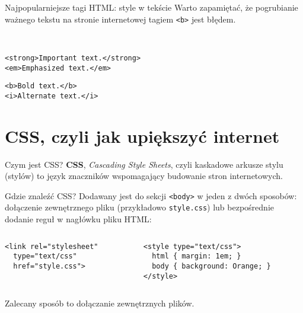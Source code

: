 \begin{frame}[fragile]{Najpopularniejsze tagi HTML: style w tekście}
	Warto zapamiętać, że pogrubianie ważnego tekstu na stronie internetowej tagiem \texttt{<b>} jest błędem. 
	
	\ \\

	\begin{lstlisting}
<strong>Important text.</strong>
<em>Emphasized text.</em>
	\end{lstlisting}
	
	\begin{lstlisting}
<b>Bold text.</b>
<i>Alternate text.</i>
	\end{lstlisting}
\end{frame}

\section{CSS, czyli jak upiększyć internet}

\begin{frame}{Czym jest CSS?}
	\textbf{CSS}, \emph{Cascading Style Sheets}, czyli kaskadowe arkusze stylu (stylów) to język znaczników wspomagający budowanie stron internetowych.
\end{frame}

\begin{frame}[fragile]{Gdzie znaleźć CSS?}
	Dodawany jest do sekcji \texttt{<body>} w jeden z dwóch sposobów: dołączenie zewnętrznego pliku (przykładowo \texttt{style.css}) lub bezpośrednie dodanie reguł w nagłówku pliku HTML:

\begin{columns}
\begin{column}{0.5\textwidth}
\begin{lstlisting}
<link rel="stylesheet"
  type="text/css"
  href="style.css">
\end{lstlisting}
\end{column}
\begin{column}{0.5\textwidth}
\begin{lstlisting}
<style type="text/css">
  html { margin: 1em; }
  body { background: Orange; }
</style>
\end{lstlisting}
\end{column}
\end{columns}

	Zalecany sposób to dołączanie zewnętrznych plików.
\end{frame}

